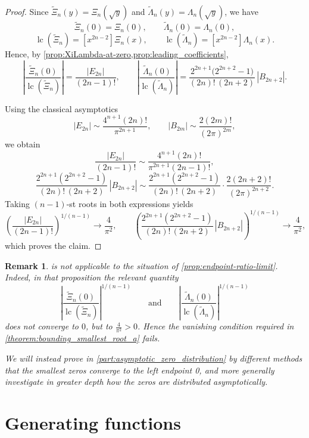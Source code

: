 \documentclass[11pt,twoside]{article}
\newtheorem{remark}[theorem]{Remark}
\numberwithin{equation}{section}
\begin{document}
\begin{proof}
Since $\widetilde{\Xi}_n(y)=\Xi_n(\sqrt y)$ and
$\widetilde{\Lambda}_n(y)=\Lambda_n(\sqrt y)$, we have
\[
\widetilde{\Xi}_n(0)=\Xi_n(0),
\qquad
\widetilde{\Lambda}_n(0)=\Lambda_n(0),
\]
\[
\operatorname{lc}(\widetilde{\Xi}_n)=[x^{2n-2}]\Xi_n(x),
\qquad
\operatorname{lc}(\widetilde{\Lambda}_n)=[x^{2n-2}]\Lambda_n(x).
\]
Hence, by \cref{prop:XiLambda-at-zero,prop:leading_coefficients},
\[
\left|
\frac{\widetilde{\Xi}_n(0)}{\operatorname{lc}(\widetilde{\Xi}_n)}
\right|
=
\frac{|E_{2n}|}{(2n-1)!},
\qquad
\left|
\frac{\widetilde{\Lambda}_n(0)}{\operatorname{lc}(\widetilde{\Lambda}_n)}
\right|
=
\frac{2^{2n+1}\bigl(2^{2n+2}-1\bigr)}{(2n)! \, (2n+2)}
\,|B_{2n+2}|.
\]

Using the classical asymptotics
\[
|E_{2n}|
\sim
\frac{4^{n+1}(2n)!}{\pi^{2n+1}},
\qquad
|B_{2m}|
\sim
\frac{2(2m)!}{(2\pi)^{2m}},
\]
we obtain
\[
\frac{|E_{2n}|}{(2n-1)!}
\sim
\frac{4^{n+1}(2n)!}{\pi^{2n+1}(2n-1)!},
\]
\[
\frac{2^{2n+1}(2^{2n+2}-1)}{(2n)! \, (2n+2)}\,|B_{2n+2}|
\sim
\frac{2^{2n+1}(2^{2n+2}-1)}{(2n)! \, (2n+2)}
\cdot
\frac{2(2n+2)!}{(2\pi)^{2n+2}}.
\]
Taking $(n-1)$-st roots in both expressions yields
\[
\left(
\frac{|E_{2n}|}{(2n-1)!}
\right)^{1/(n-1)}
\longrightarrow
\frac{4}{\pi^2},
\qquad
\left(
\frac{2^{2n+1}(2^{2n+2}-1)}{(2n)! \, (2n+2)}\,|B_{2n+2}|
\right)^{1/(n-1)}
\longrightarrow
\frac{4}{\pi^2},
\]
which proves the claim.
\end{proof}

\begin{remark}
 is not applicable to the situation of \cref{prop:endpoint-ratio-limit}. Indeed, in that proposition the relevant quantity
\[
\left|
\frac{\widetilde{\Xi}_n(0)}{\operatorname{lc}(\widetilde{\Xi}_n)}
\right|^{1/(n-1)}
\qquad\text{and}\qquad
\left|
\frac{\widetilde{\Lambda}_n(0)}{\operatorname{lc}(\widetilde{\Lambda}_n)}
\right|^{1/(n-1)}
\]
does not converge to $0$, but to $\frac{4}{\pi^2}>0$. Hence the vanishing condition required in \cref{theorem:bounding_smallest_root_a} fails.

\vspace{0.2cm}

We will instead prove in \cref{part:asymptotic_zero_distribution} by different methods that the smallest zeros converge to the left endpoint 0, and more generally investigate in greater depth how the zeros are distributed asymptotically.
\end{remark}

\section{Generating functions}
\end{document}
